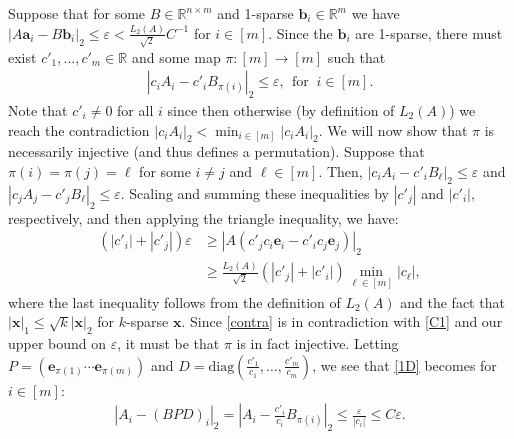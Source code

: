 \documentclass[journal, twocolumn]{IEEEtran}
\begin{document}
Suppose that for some $B \in \mathbb{R}^{n \times m}$ and 1-sparse $\mathbf{b}_i \in \mathbb{R}^m$ we have  $|A\mathbf{a}_i - B\mathbf{b}_i|_2 \leq \varepsilon < \frac{L_2(A)}{\sqrt{2}}C^{-1}$ for $i \in [m]$. Since the $\mathbf{b}_i$ are 1-sparse, there must exist $c'_1, \ldots, c'_m \in \mathbb{R}$ and some map $\pi: [m] \to [m]$ such that 
\begin{align}\label{1D}
|c_iA_i - c'_iB_{\pi(i)}|_2 \leq \varepsilon, \ \ \text{for } \  i \in [m].
\end{align} 
Note that $c'_i \neq 0$ for all $i$ since then otherwise (by definition of $L_2(A)$) we reach the contradiction $|c_iA_i|_2 < \min_{i \in [m]}|c_iA_i|_2$. We will now show that $\pi$ is necessarily injective (and thus defines a permutation). Suppose that $\pi(i) = \pi(j) = \ell$ for some $i \neq j$ and $\ell \in [m]$. Then, $|c_iA_i - c'_iB_{\ell}|_2  \leq \varepsilon$ and $|c_jA_j - c'_jB_{\ell}|_2 \leq \varepsilon$. Scaling and summing these inequalities by $|c'_j|$ and $|c'_i|$, respectively, and then applying the triangle inequality, we have:
\begin{align}\label{contra}
(|c'_i| + |c'_j|) \varepsilon
&\geq |A(c'_jc_i\mathbf{e}_i - c'_ic_j\mathbf{e}_j)|_2 \\
&\geq \frac{L_2(A)}{\sqrt{2}} \left( |c'_j| + |c'_i| \right) \min_{\ell \in [m]} |c_\ell |,
\end{align}
%
where the last inequality follows from the definition of $L_2(A)$ and the fact that $|\mathbf{x}|_1 \leq \sqrt{k}|\mathbf{x}|_2$ for $k$-sparse $\mathbf{x}$. Since \eqref{contra} is in contradiction with \eqref{C1} and our upper bound on $\varepsilon$, it must be that $\pi$ is in fact injective. Letting $P = \left( \mathbf{e}_{\pi(1)} \cdots \mathbf{e}_{\pi(m)}\right)$ and $D = \text{diag}(\frac{c'_1}{c_1},\ldots,\frac{c'_m}{c_m})$, we see that \eqref{1D} becomes for $i \in [m]$:
\begin{align}\label{k=1result}
|A_i - (BPD)_i|_2 = |A_i - \frac{c'_i}{c_i}B_{\pi(i)}|_2 \leq \frac{\varepsilon}{|c_i|} \leq C\varepsilon.
\end{align}
\end{document}
